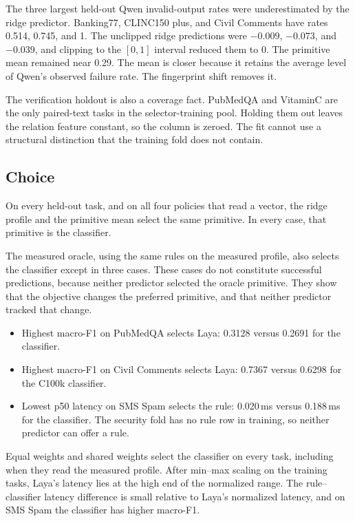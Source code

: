 The three largest held-out Qwen invalid-output rates were underestimated by the ridge predictor. Banking77, CLINC150 plus, and Civil Comments have rates 0.514, 0.745, and 1. The unclipped ridge predictions were \(-0.009\), \(-0.073\), and \(-0.039\), and clipping to the \([0,1]\) interval reduced them to 0. The primitive mean remained near 0.29. The mean is closer because it retains the average level of Qwen's observed failure rate. The fingerprint shift removes it.

The verification holdout is also a coverage fact. PubMedQA and VitaminC are the only paired-text tasks in the selector-training pool. Holding them out leaves the relation feature constant, so the column is zeroed. The fit cannot use a structural distinction that the training fold does not contain.

\subsection{Choice}
\label{sec:choice}

On every held-out task, and on all four policies that read a vector, the ridge profile and the primitive mean select the same primitive. In every case, that primitive is the classifier.

The measured oracle, using the same rules on the measured profile, also selects the classifier except in three cases. These cases do not constitute successful predictions, because neither predictor selected the oracle primitive. They show that the objective changes the preferred primitive, and that neither predictor tracked that change.
\begin{itemize}
\item Highest macro-F1 on PubMedQA selects Laya: 0.3128 versus 0.2691 for the classifier.
\item Highest macro-F1 on Civil Comments selects Laya: 0.7367 versus 0.6298 for the C100k classifier.
\item Lowest p50 latency on SMS Spam selects the rule: 0.020\,ms versus 0.188\,ms for the classifier. The security fold has no rule row in training, so neither predictor can offer a rule.
\end{itemize}

Equal weights and shared weights select the classifier on every task, including when they read the measured profile. After min--max scaling on the training tasks, Laya's latency lies at the high end of the normalized range. The rule--classifier latency difference is small relative to Laya's normalized latency, and on SMS Spam the classifier has higher macro-F1.

